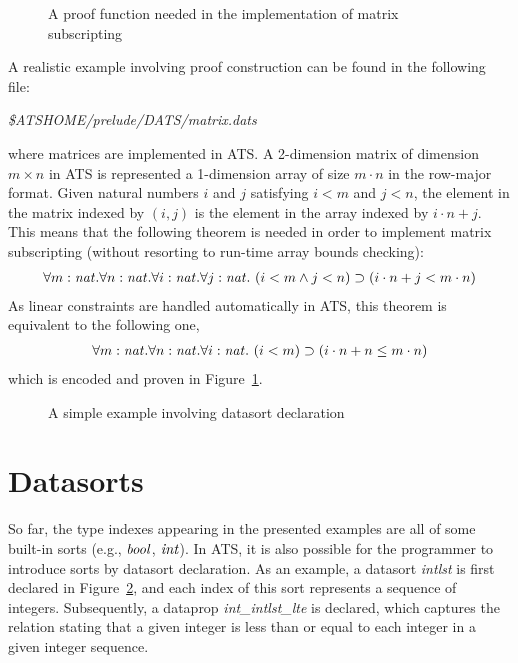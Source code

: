 \begin{figure}

\caption{A proof function needed in the implementation of matrix subscripting}
\label{figure:lemma_for_matrix_subscripting}
\end{figure}
\kern6pt
A realistic example involving proof construction can be found in
the following file:
\begin{center}
{\it \$ATSHOME/prelude/DATS/matrix.dats}
\end{center}
where matrices are implemented in ATS. A 2-dimension matrix of dimension
$m\times n$ in ATS is represented a 1-dimension array of size $m\cdot n$ in
the row-major format. Given natural numbers $i$ and $j$ satisfying $i<m$
and $j<n$, the element in the matrix indexed by $(i,j)$ is the element in
the array indexed by $i\cdot n+j$. This means that the following theorem is
needed in order to implement matrix subscripting (without resorting to
run-time array bounds checking):
\[\begin{array}{l}
\forall m:{\it nat}.\forall n:{\it nat}.\forall i:{\it nat}.\forall j:{\it nat}.~
(i<m\land j<n)\supset (i\cdot n + j < m\cdot n)
\end{array}\]
As linear constraints are handled automatically in ATS,
this theorem is equivalent to the following one,
\[\begin{array}{l}
\forall m:{\it nat}.\forall n:{\it nat}.\forall i:{\it nat}.~
(i<m)\supset (i\cdot n + n \leq m\cdot n)
\end{array}\]
which is encoded and proven in Figure~\ref{figure:lemma_for_matrix_subscripting}.

\begin{figure}[thp]

\caption{A simple example involving datasort declaration}
\label{figure:intlst_datasort_example}
\end{figure}
\section{Datasorts}
So far, the type indexes appearing in the presented examples are all of
some built-in sorts (e.g., ${\it bool}$, ${\it int}$). In ATS, it is also possible
for the programmer to introduce sorts by datasort declaration. As an
example, a datasort {\it intlst} is first declared in
Figure~\ref{figure:intlst_datasort_example}, and each index of this sort
represents a sequence of integers. Subsequently, a dataprop {\it
int\_intlst\_lte} is declared, which captures the relation stating that a
given integer is less than or equal to each integer in a given integer
sequence.

